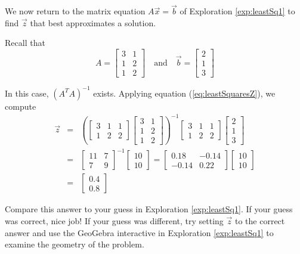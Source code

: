 \documentclass{ximera}
\begin{document}
\begin{example}\label{ex:leastSquares1}
We now return to the matrix equation $A\vec{x}=\vec{b}$ of Exploration \ref{exp:leastSq1} to find $\vec{z}$ that best approximates a solution.

\begin{explanation}
    Recall that $$A=\begin{bmatrix}3 & 1\\1 & 2\\1 & 2\end{bmatrix}\quad\text{and}\quad \vec{b}=\begin{bmatrix}2\\1\\3\end{bmatrix}$$

In this case, $(A^TA)^{-1}$ exists.  Applying equation (\ref{eq:leastSquaresZ}), we compute
\begin{eqnarray*}
\vec{z}&=&\left(\begin{bmatrix}3 & 1 & 1\\1 & 2 & 2\end{bmatrix}\begin{bmatrix}3 & 1\\1 & 2\\1& 2\end{bmatrix}\right)^{-1}\begin{bmatrix}3 & 1 & 1\\1 & 2 & 2\end{bmatrix}\begin{bmatrix}2\\1\\3\end{bmatrix}\\
&=&\begin{bmatrix}11 & 7\\7 & 9\end{bmatrix}^{-1}\begin{bmatrix}10\\10\end{bmatrix}=\begin{bmatrix}0.18 & -0.14\\-0.14 & 0.22\end{bmatrix}\begin{bmatrix}10\\10\end{bmatrix}\\
&=&\begin{bmatrix}0.4\\0.8\end{bmatrix}
    \end{eqnarray*}    
\end{explanation}
Compare this answer to your guess in Exploration \ref{exp:leastSq1}.  If your guess was correct, nice job!  If your guess was different, try setting $\vec{z}$ to the correct answer and use the GeoGebra interactive in Exploration \ref{exp:leastSq1} to examine the geometry of the problem.    
\end{example}
\end{document}
